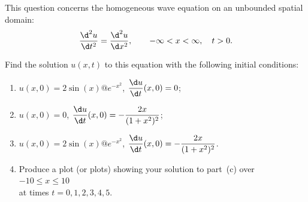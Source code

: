This question concerns the homogeneous wave equation on an unbounded spatial domain:
          \[ {\d^2 u \over \d t^2} = {\d^2 u \over \d x^2}, 
               \qquad -\infty < x < \infty,  
               \quad   t>0.\]

Find the solution $u(x,t)$ to this equation with 
the following initial conditions:
\begin{enumerate}
\item $u(x,0) = 2 \sin(x)@ e^{-x^2}$, 
      \quad ${\displaystyle{\d u\over\d t}(x,0) = 0}$;

\vspace*{1em}
\item $u(x,0) = 0$, \hspace*{4.5em}
      \quad ${\displaystyle{\d u\over\d t}(x,0) = -{2x\over (1+x^2)^2}}$;

\vspace*{1em}
\item $u(x,0) = 2 \sin(x)@ e^{-x^2}$, 
      \quad ${\displaystyle{\d u\over\d t}(x,0) = -{2x\over (1+x^2)^2}}$. 

\vspace*{1em}
\item Produce a plot (or plots) showing your solution to part~(c) over $-10\le x \le 10$\\
      at times $t=0, 1, 2, 3, 4, 5$. 
\end{enumerate}


